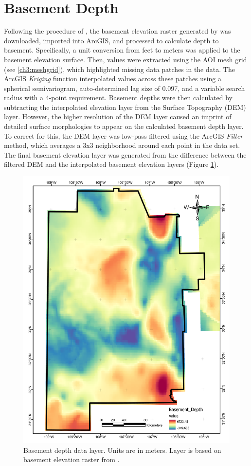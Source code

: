 \section{Basement Depth}\label{app:dl_basement_depth}
Following the procedure of \citet{pepin_new_2019}, the basement elevation raster generated by \citet{bielicki_hydrogeolgic_2015} was downloaded, imported into ArcGIS, and processed to calculate depth to basement. Specifically, a unit conversion from feet to meters was applied to the basement elevation surface. Then, values were extracted using the AOI mesh grid (see \ref{ch3:meshgrid}), which highlighted missing data patches in the data. The ArcGIS \textit{Kriging} function interpolated values across these patches using a spherical semivariogram, auto-determined lag size of 0.097, and a variable search radius with a 4-point requirement. Basement depths were then calculated by subtracting the interpolated elevation layer from the Surface Topography (DEM) layer. However, the higher resolution of the DEM layer caused an imprint of detailed surface morphologies to appear on the calculated basement depth layer. To correct for this, the DEM layer was low-pass filtered using the ArcGIS \textit{Filter} method, which averages a 3x3 neighborhood around each point in the data set. The final basement elevation layer was generated from the difference between the filtered DEM and the interpolated basement elevation layers (Figure \ref{fig:feat_basementdepth}).
\vfill
\pagebreak

\begin{figure}[H]
\centering
\includegraphics[width=0.75\linewidth]{templates/images/Figure-BasementDepth.pdf}
\caption[Basement depth data layer]{Basement depth data layer. Units are in meters. Layer is based on basement elevation raster from \protect\citet{bielicki_hydrogeolgic_2015}.}
\label{fig:feat_basementdepth}
\end{figure}
\pagebreak

